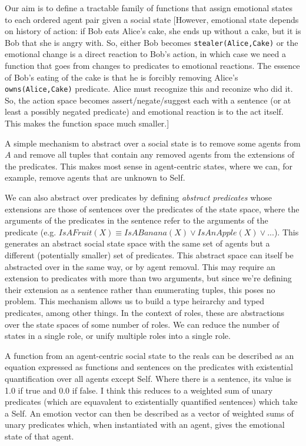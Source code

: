 \documentclass[a4paper]{article}
\begin{document}
Our aim is to define a tractable family of functions that assign emotional states to each ordered agent pair given a social state [However, emotional state depends on history of action: if Bob eats Alice's cake, she ends up without a cake, but it is Bob that she is angry with. So, either Bob becomes \texttt{stealer(Alice,Cake)} or the emotional change is a direct reaction to Bob's action, in which case we need a function that goes from changes to predicates to emotional reactions. The essence of Bob's eating of the cake is that he is forcibly removing Alice's \texttt{owns(Alice,Cake)} predicate. Alice must recognize this and reconize who did it. So, the action space becomes assert/negate/suggest each with a sentence (or at least a possibly negated predicate) and emotional reaction is to the act itself. This makes the function space much smaller.]

A simple mechanism to abstract over a social state is to remove some agents from $A$ and remove all tuples that contain any removed agents from the extensions of the predicates. This makes most sense in agent-centric states, where we can, for example, remove agents that are unknown to Self.

We can also abstract over predicates by defining \textit{abstract predicates} whose extensions are those of sentences over the predicates of the state space, where the arguments of the predicates in the sentence refer to the arguments of the predicate (e.g. $IsAFruit(X) \equiv IsABanana(X) \vee IsAnApple(X) \vee ...$). This generates an abstract social state space with the same set of agents but a different (potentially smaller) set of predicates. This abstract space can itself be abstracted over in the same way, or by agent removal. This may require an extension to predicates with more than two arguments, but since we're defining their extension as a sentence rather than enumerating tuples, this poses no problem. This mechanism allows us to build a type heirarchy and typed predicates, among other things. In the context of roles, these are abstractions over the state spaces of some number of roles. We can reduce the number of states in a single role, or unify multiple roles into a single role.

A function from an agent-centric social state to the reals can be described as an equation expressed as functions and sentences on the predicates with existential quantification over all agents except Self. Where there is a sentence, its value is 1.0 if true and 0.0 if false. I think this reduces to a weighted sum of unary predicates (which are equavalent to existentially quantified sentences) which take a Self. An emotion vector can then be described as a vector of weighted sums of unary predicates which, when instantiated with an agent, gives the emotional state of that agent.
\end{document}
